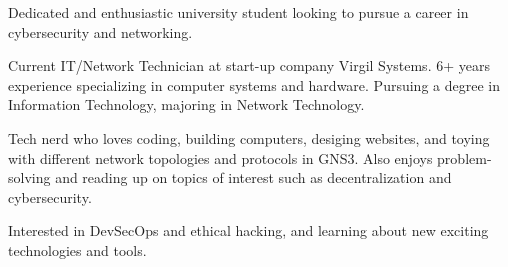 


\begin{cvparagraph}

Dedicated and enthusiastic university student looking to pursue a career in cybersecurity and networking. 
\end{cvparagraph}



\begin{cvparagraph}

Current IT/Network Technician at start-up company Virgil Systems. 6+ years experience specializing in computer systems and hardware. Pursuing a degree in Information Technology, majoring in Network Technology.

Tech nerd who loves coding, building computers, desiging websites, and toying with different network topologies and protocols in GNS3. Also enjoys problem-solving and reading up on topics of interest such as decentralization and cybersecurity.

Interested in DevSecOps and ethical hacking, and learning about new exciting technologies and tools.
\end{cvparagraph}
